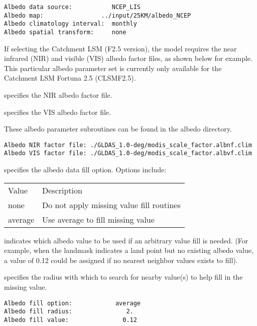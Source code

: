  \begin{Verbatim}[frame=single]
Albedo data source:           NCEP_LIS
Albedo map:                ../input/25KM/albedo_NCEP 
Albedo climatology interval:  monthly  
Albedo spatial transform:     none
 \end{Verbatim}

 
 If selecting the Catchment LSM (F2.5 version), the model requires the
 near infrared (NIR) and visible (VIS) albedo factor files, as shown
 below for example. 
 This particular albedo parameter set is currently only available for the
 Catchment LSM Fortuna 2.5 (CLSMF2.5).

  specifies the NIR albedo factor file. 

  specifies the VIS albedo factor file. 

 These albedo parameter subroutines can be found in the albedo directory.
  

 \begin{Verbatim}[frame=single]
Albedo NIR factor file: ./GLDAS_1.0-deg/modis_scale_factor.albnf.clim
Albedo VIS factor file: ./GLDAS_1.0-deg/modis_scale_factor.albvf.clim
 \end{Verbatim}

 
  specifies the albedo
 data fill option.  Options include:

 \begin{tabular}{ll}
 Value   & Description                              \\
 none    & Do not apply missing value fill routines \\
 average & Use average to fill missing value        \\
 \end{tabular}

  indicates which albedo
 value to be used if an arbitrary value fill is needed. 
(For example, when the landmask indicates a land point but no existing 
 albedo value, a value of 0.12 could be assigned if 
 no nearest neighbor values exists to fill).

  specifies the radius with which
 to search for nearby value(s) to help fill in the missing value.
 

 \begin{Verbatim}[frame=single]
Albedo fill option:            average
Albedo fill radius:               2.
Albedo fill value:               0.12
 \end{Verbatim}


